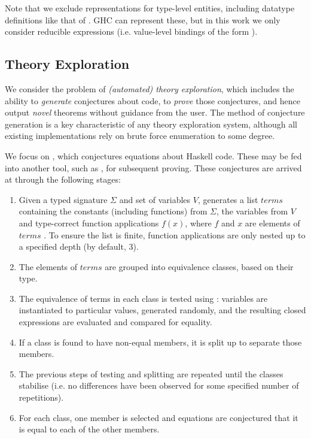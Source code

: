Note that we exclude representations for type-level entities, including datatype definitions like that of . GHC can represent these, but in this work we only consider reducible expressions (i.e. value-level bindings of the form \mbox{}).

\subsection{Theory Exploration}
\label{sec:theoryexploration}

We consider the problem of \emph{(automated) theory exploration}, which includes the ability to \emph{generate} conjectures about code, to \emph{prove} those conjectures, and hence output \emph{novel} theorems without guidance from the user. The method of conjecture generation is a key characteristic of any theory exploration system, although all existing implementations rely on brute force enumeration to some degree.

We focus on \qspec{} \cite{QuickSpec}, which conjectures equations about Haskell code. These may be fed into another tool, such as \hspec{}, for subsequent proving. These conjectures are arrived at through the following stages:

\iffalse TODO: Make this more formal?
 V \in Var
 F \in Fun
 T \in Term
 T ::= V | F | T1 T2

 Term ::= VAR | Const | Fun (Term)
or
 Term t ::= x | f | t t'
\fi

\begin{enumerate}
  \item Given a typed signature $\Sigma$ and set of variables $V$, \qspec{} generates a list $terms$ containing the constants (including functions) from $\Sigma$, the variables from $V$ and type-correct function applications $f(x)$, where $f$ and $x$ are elements of $terms$ \iffalse TODO: A little awkward; maybe use the above notation? \fi. To ensure the list is finite, function applications are only nested up to a specified depth (by default, 3).
  \item The elements of $terms$ are grouped into equivalence classes, based on their type.
  \item The equivalence of terms in each class is tested using \qcheck{}: variables are instantiated to particular values, generated randomly, and the resulting closed expressions are evaluated and compared for equality.
  \item If a class is found to have non-equal members, it is split up to separate those members.
  \item The previous steps of testing and splitting are repeated until the classes stabilise (i.e. no differences have been observed for some specified number of repetitions).
  \item For each class, one member is selected and equations are conjectured that it is equal to each of the other members.
\end{enumerate}

